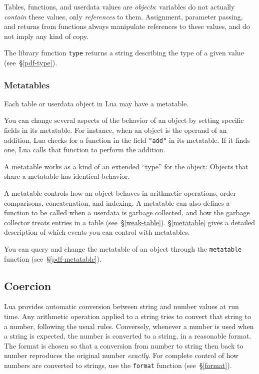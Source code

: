 \documentclass[11pt,twoside,draft]{article}
\makeatletter
\newcommand{\See}[1]{\S\ref{#1}}
\newcommand{\see}[1]{(see~\See{#1})}
\newcommand{\Index}[1]{#1\index{#1@{\lowercase{#1}}}}
\makeatother
\begin{document}
Tables, functions, and userdata values are \emph{objects}:
variables do not actually \emph{contain} these values,
only \emph{references} to them.
Assignment, parameter passing, and returns from functions
always manipulate references to these values,
and do not imply any kind of copy.

The library function \verb|type| returns a string describing the type
of a given value \see{pdf-type}.

\subsubsection{Metatables}

Each table or userdata object in Lua may have a \Index{metatable}.

You can change several aspects of the behavior
of an object by setting specific fields in its metatable.
For instance, when an object is the operand of an addition,
Lua checks for a function in the field \verb|"add"| in its metatable.
If it finds one,
Lua calls that function to perform the addition.

A metatable works as a kind of an extended ``type'' for the object:
Objects that share a metatable has identical behavior.

A metatable controls how an object behaves in arithmetic operations,
order comparisons, concatenation, and indexing.
A metatable can also defines a function to be called when a userdata
is garbage collected,
and how the garbage collector treats entries in a table
\see{weak-table}.
\See{metatable} gives a detailed description of which events you
can control with metatables.

You can query and change the metatable of an object
through the \verb|metatable| function \see{pdf-metatable}.



\subsection{\Index{Coercion}} \label{coercion}

Lua provides automatic conversion between
string and number values at run time.
Any arithmetic operation applied to a string tries to convert
that string to a number, following the usual rules.
Conversely, whenever a number is used when a string is expected,
the number is converted to a string, in a reasonable format.
The format is chosen so that
a conversion from number to string then back to number
reproduces the original number \emph{exactly}.
For complete control of how numbers are converted to strings,
use the \verb|format| function \see{format}.
\end{document}
